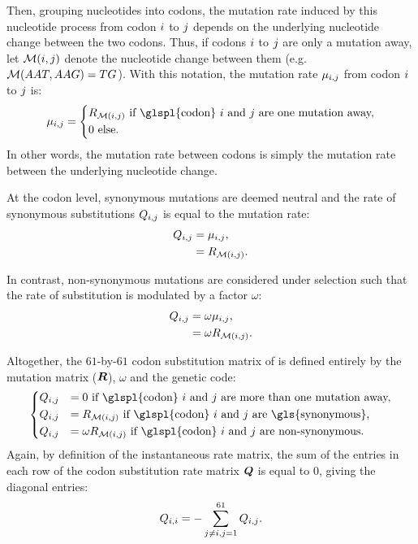 Then, grouping nucleotides into \glspl{codon}, the mutation rate induced by this nucleotide process from \gls{codon} ${i}$ to ${j}$ depends on the underlying nucleotide change between the two \glspl{codon}.
Thus, if \glspl{codon} ${i}$ to ${j}$ are only a mutation away, let $\mathcal{M}({i}, {j})$ denote the nucleotide change between them (e.g.~$\mathcal{M}(AAT, AAG) = TG$).
With this notation, the mutation rate $\mu_{{i}, {j}}$ from \gls{codon} ${i}$ to ${j}$ is:
\begin{equation}
    \mu_{\itoj} =
    \begin{dcases}
        \mutmatrix_{\nucitoj} \text{ if \glspl{codon} $\ci$ and $\cj$ are one mutation away,} \\
        0 \text{ else.}
    \end{dcases}
\end{equation}
In other words, the mutation rate between \glspl{codon} is simply the mutation rate between the underlying nucleotide change.

At the \gls{codon} level, \gls{synonymous} mutations are deemed \gls{neutral} and the rate of \gls{synonymous} \glspl{substitution} ${Q_{{i}, {j}}}$ is equal to the mutation rate:
\begin{align}
    Q_{{i}, {j}} & = \mu_{{i}, {j}}, \\
    & = R_{\mathcal{M}({i}, {j})}.
\end{align}

In contrast, \gls{non-synonymous} mutations are considered under selection such that the rate of \gls{substitution} is modulated by a factor $\omega$:
\begin{align}
    Q_{{i}, {j}} & = \omega \mu_{{i}, {j}}, \\
    & = \omega R_{\mathcal{M}({i}, {j})}.
\end{align}

Altogether, the $61$-by-$61$ \gls{codon} \gls{substitution} matrix of \citet{Muse1994} is defined entirely by the mutation matrix ($\bm{R}$), $\omega$ and the genetic code:
\begin{equation}
    \begin{dcases}
        \submatrix_{\itoj} & = 0 \text{ if \glspl{codon} $\ci$ and $\cj$ are more than one mutation away,} \\
        \submatrix_{\itoj} & = \mutmatrix_{\nucitoj} \text{ if \glspl{codon} $\ci$ and $\cj$ are \gls{synonymous},} \\
        \submatrix_{\itoj} & = \omega \mutmatrix_{\nucitoj} \text{ if \glspl{codon} $\ci$ and $\cj$ are non-synonymous}.
    \end{dcases}
    \label{eq:codon-models}
\end{equation}
Again, by definition of the instantaneous rate matrix, the sum of the entries in each row of the \gls{codon} \gls{substitution} rate matrix $\bm{Q}$ is equal to $0$, giving the diagonal entries:
\begin{equation}
    Q_{{i}, {i}} = - \sum\limits_{{j} \neq {i}, {j} = 1}^{61} Q_{{i}, {j}}.
\end{equation}

